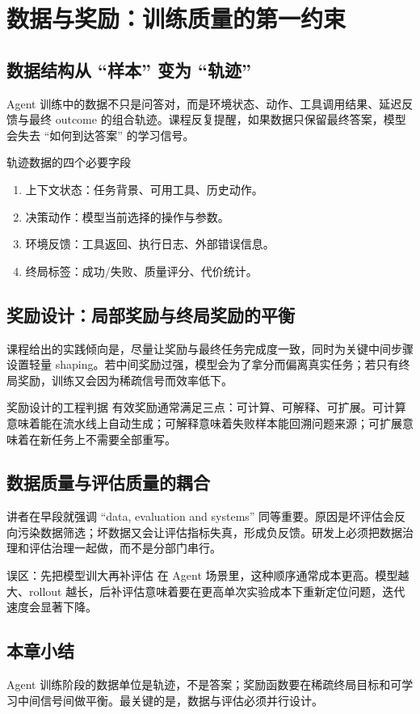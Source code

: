 \section{数据与奖励：训练质量的第一约束}

\subsection{数据结构从 ``样本'' 变为 ``轨迹''}
Agent 训练中的数据不只是问答对，而是环境状态、动作、工具调用结果、延迟反馈与最终 outcome 的组合轨迹。课程反复提醒，如果数据只保留最终答案，模型会失去 ``如何到达答案'' 的学习信号。

\begin{knowledgebox}{轨迹数据的四个必要字段}
\begin{enumerate}
    \item 上下文状态：任务背景、可用工具、历史动作。
    \item 决策动作：模型当前选择的操作与参数。
    \item 环境反馈：工具返回、执行日志、外部错误信息。
    \item 终局标签：成功/失败、质量评分、代价统计。
\end{enumerate}
\end{knowledgebox}

\subsection{奖励设计：局部奖励与终局奖励的平衡}
课程给出的实践倾向是，尽量让奖励与最终任务完成度一致，同时为关键中间步骤设置轻量 shaping。若中间奖励过强，模型会为了拿分而偏离真实任务；若只有终局奖励，训练又会因为稀疏信号而效率低下。

\begin{importantbox}{奖励设计的工程判据}
有效奖励通常满足三点：可计算、可解释、可扩展。可计算意味着能在流水线上自动生成；可解释意味着失败样本能回溯问题来源；可扩展意味着在新任务上不需要全部重写。
\end{importantbox}

\subsection{数据质量与评估质量的耦合}
讲者在早段就强调 ``data, evaluation and systems'' 同等重要。原因是坏评估会反向污染数据筛选；坏数据又会让评估指标失真，形成负反馈。研发上必须把数据治理和评估治理一起做，而不是分部门串行。

\begin{warningbox}{误区：先把模型训大再补评估}
在 Agent 场景里，这种顺序通常成本更高。模型越大、rollout 越长，后补评估意味着要在更高单次实验成本下重新定位问题，迭代速度会显著下降。
\end{warningbox}

\subsection{本章小结}
Agent 训练阶段的数据单位是轨迹，不是答案；奖励函数要在稀疏终局目标和可学习中间信号间做平衡。最关键的是，数据与评估必须并行设计。


